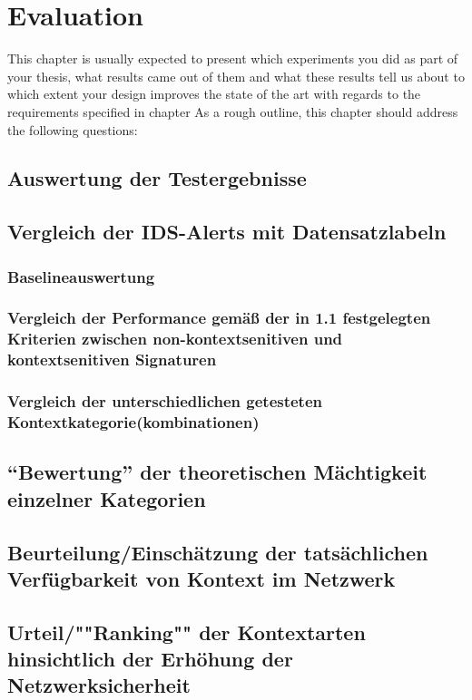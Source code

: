 \chapter{Evaluation}%
\label{cha:evaluation}

This chapter is usually expected to present which experiments you did as part of your thesis, what results came out of them and what these results tell us about to which extent your design improves the state of the art with regards to the requirements specified in chapter
As a rough outline, this chapter should address the following questions:

\section{Auswertung der Testergebnisse}
\section{ Vergleich der IDS-Alerts mit Datensatzlabeln}
\subsection{ Baselineauswertung } 
\subsection{ Vergleich der Performance gemäß der in 1.1 festgelegten Kriterien zwischen non-kontextsenitiven und kontextsenitiven Signaturen} 
\subsection{ Vergleich der unterschiedlichen getesteten Kontextkategorie(kombinationen)} 

\section{ “Bewertung” der theoretischen Mächtigkeit einzelner Kategorien} 
\section{ Beurteilung/Einschätzung der tatsächlichen Verfügbarkeit von Kontext im Netzwerk }


\section{ Urteil/""Ranking"" der Kontextarten hinsichtlich der Erhöhung der Netzwerksicherheit}

